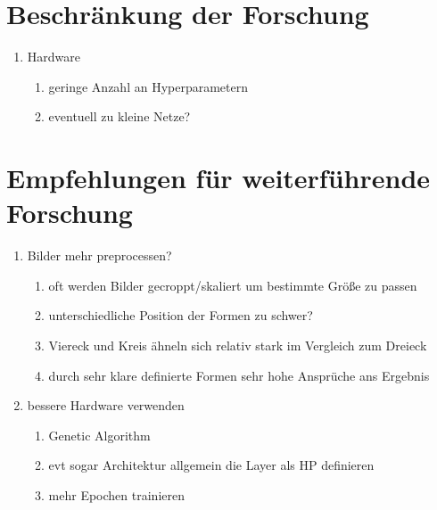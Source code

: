 \section{Beschränkung der Forschung}

\begin{enumerate}
	\item Hardware
	\begin{enumerate}
		\item geringe Anzahl an Hyperparametern
		\item eventuell zu kleine Netze?
	\end{enumerate}
\end{enumerate}

\section{Empfehlungen für weiterführende Forschung}
\begin{enumerate}
	\item Bilder mehr preprocessen?
	\begin{enumerate}
		\item oft werden Bilder gecroppt/skaliert um bestimmte Größe zu passen
		\item unterschiedliche Position der Formen zu schwer?
		\item Viereck und Kreis ähneln sich relativ stark im Vergleich zum Dreieck
		\item durch sehr klare definierte Formen sehr hohe Ansprüche ans Ergebnis
	\end{enumerate}

	\item bessere Hardware verwenden
	\begin{enumerate}
		\item Genetic Algorithm
		\item evt sogar Architektur allgemein die Layer als HP definieren
		\item mehr Epochen trainieren
	\end{enumerate}
\end{enumerate}